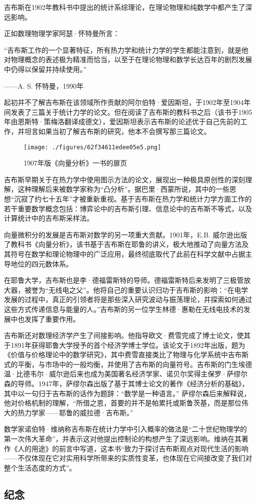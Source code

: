 吉布斯在1902年教科书中提出的统计系综理论，在理论物理和纯数学中都产生了深远影响。

正如数理物理学家阿瑟·怀特曼所言：

“吉布斯工作的一个显著特征，所有热力学和统计力学的学生都能注意到，就是他对物理概念的表述极为精准而恰当，以至于在理论物理和数学长达百年的剧烈发展中仍得以保留并持续使用。”

——A. S. 怀特曼，1990年

起初并不了解吉布斯在该领域所作贡献的阿尔伯特·爱因斯坦，于1902年至1904年间发表了三篇关于统计力学的论文。但在阅读了吉布斯的教科书之后（该书于1905年由恩斯特·策梅洛翻译成德文），爱因斯坦表示吉布斯的论述优于自己先前的工作，并坦言如果当初了解吉布斯的研究，他本不会撰写那三篇论文。
\begin{figure}[ht]
\centering
\texttt{[image: ./figures/62f34611edee05e5.png]}
\caption{1907年版《向量分析》一书的扉页} \label{fig_QSY_12}
\end{figure}
吉布斯早期关于在热力学中使用图示方法的论文，展现出一种极具原创性的深刻理解，这种理解后来被数学家称为“凸分析”。据巴里·西蒙所说，其中的一些思想“沉寂了约七十五年”才被重新重视。基于吉布斯在热力学和统计力学方面工作的若干重要数学概念包括：博弈论中的吉布斯引理、信息论中的吉布斯不等式，以及计算统计中的吉布斯采样法。

向量微积分的发展是吉布斯对数学的另一项重大贡献。1901年，E.B. 威尔逊出版了教科书《向量分析》，该书基于吉布斯在耶鲁的讲义，极大地推动了向量方法及其符号在数学和理论物理中的广泛应用，最终彻底取代了此前在科学文献中占据主导地位的四元数体系。

在耶鲁大学，吉布斯也是李·德福雷斯特的导师。德福雷斯特后来发明了三极管放大器，被誉为“无线电之父”。他将自己的重要认识归功于吉布斯的影响：“在电学发展的过程中，真正的引领者将是那些深入研究波动与振荡理论，并探索如何通过这些方式传递信息与能量的人。”吉布斯的另一位学生林德·惠勒在无线电技术的发展中也发挥了重要作用。

吉布斯还对数理经济学产生了间接影响。他指导欧文·费雪完成了博士论文，使其于1891年获得耶鲁大学授予的首个经济学博士学位。该论文于1892年出版，题为《价值与价格理论中的数学研究》，其中费雪直接类比了物理与化学系统中吉布斯式的平衡，与市场中的一般均衡，并使用了吉布斯的向量符号。吉布斯的门生埃德温·比德韦尔·威尔逊后来也成为美国著名经济学家、诺贝尔奖得主保罗·萨缪尔森的导师。1947年，萨缪尔森出版了基于其博士论文的著作《经济分析的基础》，其中以一句归于吉布斯的话作为题辞：“数学是一种语言。” 萨缪尔森后来解释说，他对价格机制的理解，“所借之恩，首要的并不是帕累托或斯鲁茨基，而是那位伟大的热力学家——耶鲁的威拉德·吉布斯。”

数学家诺伯特·维纳称吉布斯在统计力学中引入概率的做法是“二十世纪物理学的第一次伟大革命”，并表示这对他提出控制论的构想产生了深远影响。维纳在其著作《人的用途》的前言中写道，这本书“致力于探讨吉布斯观点对现代生活的影响——不仅体现在它对实用科学所带来的实质性变革，也体现在它间接改变了我们对整个生活态度的方式”。
\subsection{纪念}
